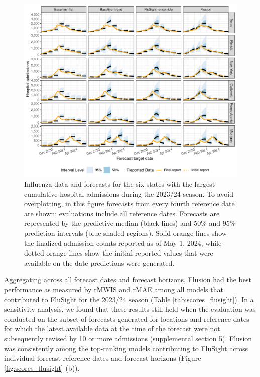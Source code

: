 \documentclass{article}\usepackage[]{graphicx}\usepackage[]{xcolor}
\begin{document}
\begin{figure}[!htb]
    \centering
    \includegraphics[width=\textwidth]{../artifacts/figures/forecasts_flusight.pdf}
    \caption{Influenza data and forecasts for the six states with the largest cumulative hospital admissions during the 2023/24 season. To avoid overplotting, in this figure forecasts from every fourth reference date are shown; evaluations include all reference dates. Forecasts are represented by the predictive median (black lines) and 50\% and 95\% prediction intervals (blue shaded regions). Solid orange lines show the finalized admission counts reported as of May 1, 2024, while dotted orange lines show the initial reported values that were available on the date predictions were generated.}
    \label{fig:forecasts_flusight}
\end{figure}

Aggregating across all forecast dates and forecast horizons, Flusion had the best performance as measured by rMWIS and rMAE among all models that contributed to FluSight for the 2023/24 season (Table \ref{tab:scores_flusight}). In a sensitivity analysis, we found that these results still held when the evaluation was conducted on the subset of forecasts generated for locations and reference dates for which the latest available data at the time of the forecast were not subsequently revised by 10 or more admissions (supplemental section 5). Flusion was consistently among the top-ranking models contributing to FluSight across individual forecast reference dates and forecast horizons (Figure \ref{fig:scores_flusight} (b)).
\end{document}
